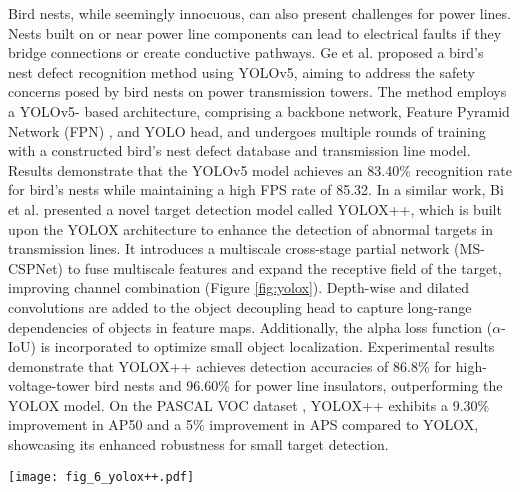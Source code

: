 Bird nests, while seemingly innocuous, can also present challenges for power lines. Nests built on or near power line components can lead to electrical faults if they bridge connections or create conductive pathways. Ge et al. \cite{ge_birds_2022} proposed a bird's nest defect recognition method using YOLOv5, aiming to address the safety concerns posed by bird nests on power transmission towers. The method employs a YOLOv5- based architecture, comprising a backbone network, Feature Pyramid Network (FPN) \cite{lin2017feature}, and YOLO head, and undergoes multiple rounds of training with a constructed bird's nest defect database and transmission line model. Results demonstrate that the YOLOv5 model achieves an 83.40\% recognition rate for bird's nests while maintaining a high FPS rate of 85.32. In a similar work, Bi et al. \cite{bi_yolox_2023} presented a novel target detection model called YOLOX++, which is built upon the YOLOX \cite{ge2021yolox} architecture to enhance the detection of abnormal targets in transmission lines. It introduces a multiscale cross-stage partial network (MS-CSPNet) to fuse multiscale features and expand the receptive field of the target, improving channel combination (Figure \ref{fig:yolox}). Depth-wise and dilated convolutions are added to the object decoupling head to capture long-range dependencies of objects in feature maps. Additionally, the alpha loss function ($\alpha$-IoU) is incorporated to optimize small object localization. Experimental results demonstrate that YOLOX++ achieves detection accuracies of 86.8\% for high-voltage-tower bird nests and 96.60\% for power line insulators, outperforming the YOLOX model. On the PASCAL VOC dataset \cite{everingham2010pascal}, YOLOX++ exhibits a 9.30\% improvement in AP50 and a 5\% improvement in APS compared to YOLOX, showcasing its enhanced robustness for small target detection.

\begin{figure*}[htb]
    \centering
    \texttt{[image: fig\_6\_yolox++.pdf]}
    \caption{The simplified network architecture of the proposed YOLOX++ network \cite{bi_yolox_2023}.}
    \label{fig:yolox}
\end{figure*}

